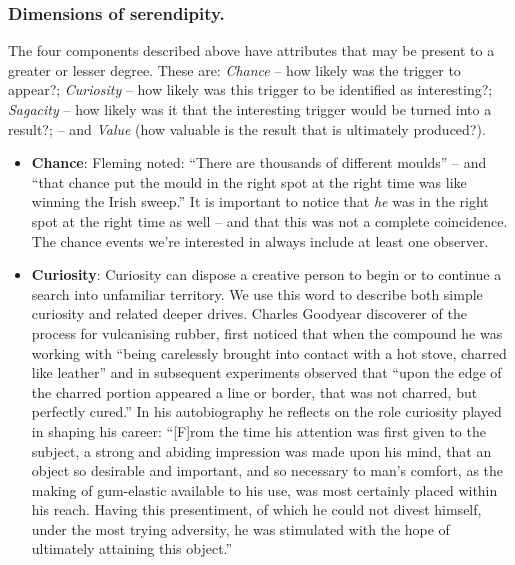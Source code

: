 \subsubsection{Dimensions of serendipity.}

The four components described above have attributes that may be present to a greater or lesser degree.  These are: \emph{Chance} -- how likely was the trigger to appear?; \emph{Curiosity} -- how likely was this trigger to be identified as interesting?; \emph{Sagacity} -- how likely was it that the interesting trigger would be turned into a result?; -- and \emph{Value} (how valuable is the result that is ultimately produced?).

\begin{itemize}
\item \textbf{Chance}: Fleming \citeyear{fleming} noted: ``There are
  thousands of different moulds'' -- and ``that chance put the mould
  in the right spot at the right time was like winning the Irish
  sweep.''  It is important to notice that \emph{he} was in the right
  spot at the right time as well -- and that this was not a complete
  coincidence.  The chance events we're interested in always include
  at least one observer.
\end{itemize}

\begin{itemize}
\item \textbf{Curiosity}: Curiosity can dispose a creative person to
  begin or to continue a search into unfamiliar territory.  We use
  this word to describe both simple curiosity and related deeper
  drives.  Charles Goodyear \citeyear{goodyear1855gum} discoverer of
  the process for vulcanising rubber, first noticed that when the
  compound he was working with ``being carelessly brought into contact
  with a hot stove, charred like leather'' and in subsequent
  experiments observed that ``upon the edge of the charred portion
  appeared a line or border, that was not charred, but perfectly
  cured.''  In his autobiography he reflects on the role curiosity
  played in shaping his career: ``[F]rom the time his attention was
  first given to the subject, a strong and abiding impression was made
  upon his mind, that an object so desirable and important, and so
  necessary to man's comfort, as the making of gum-elastic available
  to his use, was most certainly placed within his reach.  Having this
  presentiment, of which he could not divest himself, under the most
  trying adversity, he was stimulated with the hope of ultimately
  attaining this object.''
\end{itemize}

